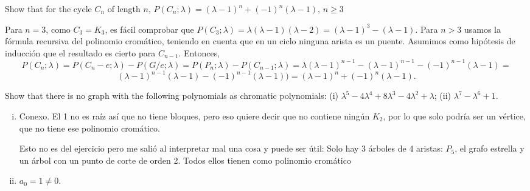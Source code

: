 \documentclass[twoside]{article}
\begin{document}
\newpage

\begin{ejercicio}{3.6}
Show that for the cycle $C_n$ of length $n$, $P(C_n; λ) = (λ − 1)^n + (−1)^n
(λ − 1)$, $n ≥ 3$
\end{ejercicio}
\begin{solucion}
Para $n=3$, como $C_3=K_3$, es fácil comprobar que $P(C_3;\lambda)=\lambda(\lambda-1)(\lambda-2)=(λ − 1)^3 −(λ − 1)$. Para $n>3$ usamos la fórmula recursiva del polinomio cromático, teniendo en cuenta que en un ciclo ninguna arista es un puente. Asumimos como hipótesis de inducción que el resultado es cierto para $C_{n-1}$. Entonces, 
\[
P(C_n;\lambda)=P(C_n-e;\lambda)-P(G/e;\lambda)=P(P_n;\lambda)-P(C_{n-1};\lambda)=\lambda(\lambda-1)^{n-1}-(λ − 1)^{n-1} - (−1)^{n-1}(λ − 1)=
\]
\[
(λ − 1)^{n-1}(\lambda-1)-(−1)^{n-1}(λ − 1))=(λ − 1)^n+(−1)^n(λ − 1).
\]


%
\end{solucion}

\newpage

\begin{ejercicio}{3.7}
Show that there is no graph with the following polynomials as chromatic polynomials:
(i) $λ^5 − 4λ^4 + 8λ^3 − 4λ^2 + λ$; (ii) $λ^7 − λ^6 + 1$.
\end{ejercicio}
\begin{solucion}
\begin{enumerate}[(i)]
\item Conexo. El 1 no es raíz así que no tiene bloques, pero eso quiere decir que no contiene ningún $K_2$, por lo que solo podría ser un vértice, que no tiene ese polinomio cromático. 

Esto no es del ejercicio pero me salió al interpretar mal una cosa y puede ser útil: Solo hay 3 árboles de 4 aristas: $P_5$, el grafo estrella y un árbol con un punto de corte de orden 2. Todos ellos tienen como polinomio cromático
\item $a_0=1\neq 0$. 
\end{enumerate}
\end{solucion}

\newpage
\end{document}
